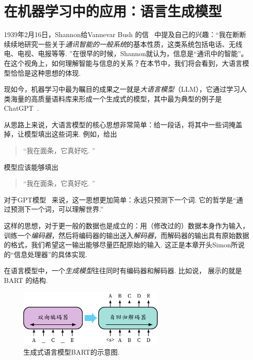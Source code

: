 \section{在机器学习中的应用：语言生成模型}\label{sec:language-models}

1939年2月16日，Shannon给Vannevar Bush 的信~\cite{shannonLetterVannevarBush1993} 中提及自己的兴趣：“我在断断续续地研究一些关于\textit{通讯智能的一般系统}的基本性质，这类系统包括电话、无线电、电视、电报等等. ”在很早的时候，Shannon就认为，信息是“通讯中的智能”。在这个视角上，如何理解智能与信息的关系？在本节中，我们将会看到，大语言模型恰恰是这种思想的体现.


现如今，机器学习中最为瞩目的成果之一就是\textit{大语言模型}（LLM），它通过学习人类海量的高质量语料库来形成一个生成式的模型，其中最为典型的例子是ChatGPT~\cite{ChatGPTOpenAI}.

从思路上来说，大语言模型的核心思想非常简单：给一段话，将其中一些词掩盖掉，让模型填出这些词来. 例如，给出
\begin{quotation}
    “我在\light{[mask]}面条，它真好吃. ”    
\end{quotation}
模型应该能够填出
\begin{quotation}
    “我在面条，它真好吃. ”
\end{quotation}

对于GPT模型~\cite{radfordImprovingLanguageUnderstanding} 来说，这一思想更加简单：永远只预测下一个词. 它的哲学是“通过预测下一个词，可以理解世界.”

这样的思想，对于更一般的数据也是成立的：用（修改过的）数据本身作为输入，训练一个\textit{编码器}，然后将编码器的输出送入\textit{解码器}，而解码器的输出具有原始数据的格式，我们希望这一输出能够尽量匹配原始的输入. 这正是本章开头Simon所说的“信息处理器”的具体实现. 

在语言模型中，一个\textit{生成模型}往往同时有编码器和解码器. 比如说， 展示的就是BART  \cite{lewisBARTDenoisingSequencetoSequence2019} 的结构.

\begin{figure}[ht]
    \centering
    \includegraphics[width=0.65\textwidth]{figures/information-theory/bart.pdf}
    \caption{生成式语言模型BART的示意图.}
    \label{fig:autoencoder}
\end{figure}

